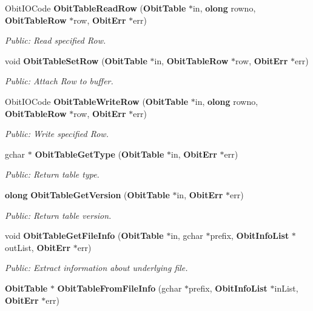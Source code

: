 \begin{CompactItemize}
Obit\-IOCode {\bf Obit\-Table\-Read\-Row} ({\bf Obit\-Table} $\ast$in, {\bf olong} rowno, {\bf Obit\-Table\-Row} $\ast$row, {\bf Obit\-Err} $\ast$err)
\begin{CompactList}\small\item\em Public: Read specified Row. \item\end{CompactList}\item 
void {\bf Obit\-Table\-Set\-Row} ({\bf Obit\-Table} $\ast$in, {\bf Obit\-Table\-Row} $\ast$row, {\bf Obit\-Err} $\ast$err)
\begin{CompactList}\small\item\em Public: Attach Row to buffer. \item\end{CompactList}\item 
Obit\-IOCode {\bf Obit\-Table\-Write\-Row} ({\bf Obit\-Table} $\ast$in, {\bf olong} rowno, {\bf Obit\-Table\-Row} $\ast$row, {\bf Obit\-Err} $\ast$err)
\begin{CompactList}\small\item\em Public: Write specified Row. \item\end{CompactList}\item 
gchar $\ast$ {\bf Obit\-Table\-Get\-Type} ({\bf Obit\-Table} $\ast$in, {\bf Obit\-Err} $\ast$err)
\begin{CompactList}\small\item\em Public: Return table type. \item\end{CompactList}\item 
{\bf olong} {\bf Obit\-Table\-Get\-Version} ({\bf Obit\-Table} $\ast$in, {\bf Obit\-Err} $\ast$err)
\begin{CompactList}\small\item\em Public: Return table version. \item\end{CompactList}\item 
void {\bf Obit\-Table\-Get\-File\-Info} ({\bf Obit\-Table} $\ast$in, gchar $\ast$prefix, {\bf Obit\-Info\-List} $\ast$out\-List, {\bf Obit\-Err} $\ast$err)
\begin{CompactList}\small\item\em Public: Extract information about underlying file. \item\end{CompactList}\item 
{\bf Obit\-Table} $\ast$ {\bf Obit\-Table\-From\-File\-Info} (gchar $\ast$prefix, {\bf Obit\-Info\-List} $\ast$in\-List, {\bf Obit\-Err} $\ast$err)

\end{CompactItemize}
